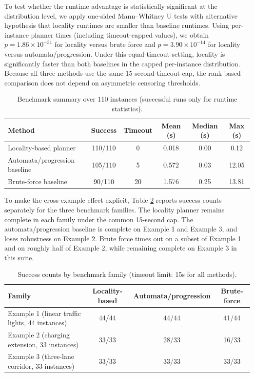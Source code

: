 \documentclass[]{jair}
\begin{document}
To test whether the runtime advantage is statistically significant at the distribution level, we apply one-sided Mann--Whitney U tests with alternative hypothesis that locality runtimes are smaller than baseline runtimes. Using per-instance planner times (including timeout-capped values), we obtain $p=1.86\times 10^{-31}$ for locality versus brute force and $p=3.90\times 10^{-14}$ for locality versus automata/progression. Under this equal-timeout setting, locality is significantly faster than both baselines in the capped per-instance distribution.
Because all three methods use the same 15-second timeout cap, the rank-based comparison does not depend on asymmetric censoring thresholds.

\begin{table}[ht!]
\centering
\caption{Benchmark summary over 110 instances (successful runs only for runtime statistics).}
\label{t:eval}
\begin{tabular}{lccccc}
\toprule
Method & Success & Timeout & Mean (s) & Median (s) & Max (s) \\
\midrule
Locality-based planner & 110/110 & 0 & 0.018 & 0.00 & 0.12 \\
Automata/progression baseline & 105/110 & 5 & 0.572 & 0.03 & 12.05 \\
Brute-force baseline & 90/110 & 20 & 1.576 & 0.25 & 13.81 \\
\bottomrule
\end{tabular}
\end{table}

To make the cross-example effect explicit, Table \ref{t:eval-families} reports success counts separately for the three benchmark families. The locality planner remains complete in each family under the common 15-second cap. The automata/progression baseline is complete on Example 1 and Example 3, and loses robustness on Example 2. Brute force times out on a subset of Example 1 and on roughly half of Example 2, while remaining complete on Example 3 in this suite.

\begin{table}[ht!]
\centering
\caption{Success counts by benchmark family (timeout limit: 15s for all methods).}
\label{t:eval-families}
\begin{tabular}{lccc}
\toprule
Family & Locality-based & Automata/progression & Brute-force \\
\midrule
Example 1 (linear traffic lights, 44 instances) & 44/44 & 44/44 & 41/44 \\
Example 2 (charging extension, 33 instances) & 33/33 & 28/33 & 16/33 \\
Example 3 (three-lane corridor, 33 instances) & 33/33 & 33/33 & 33/33 \\
\bottomrule
\end{tabular}
\end{table}
\end{document}
